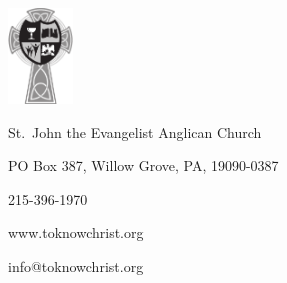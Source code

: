 \documentclass[../../../00-ncc_main.tex]{subfiles}
\begin{document}
\printindex[3jo]

\printindex[jud]

\printindex[rev]


\pagestyle{empty}

\hspace{1in}

\newpage

\pagestyle{empty}

\vfill


\begin{center}

\includegraphics[height=1in]{SJEAC-logo-gray.pdf}
\end{center}

\vfill

\begin{center}
	\begin{minipage}{2.9in}
	\begin{center}
	St.\ John the Evangelist Anglican Church

	PO Box 387, Willow Grove, PA, 19090-0387

	215-396-1970

	www.toknowchrist.org

	info@toknowchrist.org
	\end{center}
	\end{minipage}
\end{center}

\vfill
\end{document}
